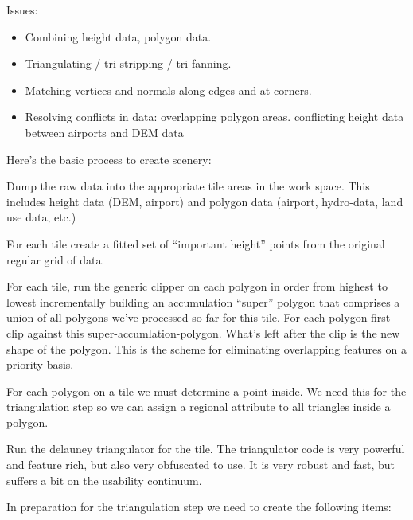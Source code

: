 \documentclass[12pt]{article}
\begin{document}
Issues:

\begin{itemize}
\item Combining height data, polygon data.

\item Triangulating / tri-stripping / tri-fanning.

\item Matching vertices and normals along edges and at corners.

\item Resolving conflicts in data:
  overlapping polygon areas.
  conflicting height data between airports and DEM data
\end{itemize}

Here's the basic process to create scenery:

Dump the raw data into the appropriate tile areas in the work space.
This includes height data (DEM, airport) and polygon data (airport,
hydro-data, land use data, etc.)

For each tile create a fitted set of ``important height'' points from
the original regular grid of data.

For each tile, run the generic clipper on each polygon in order from
highest to lowest incrementally building an accumulation ``super''
polygon that comprises a union of all polygons we've processed so far
for this tile.  For each polygon first clip against this
super-accumlation-polygon.  What's left after the clip is the new
shape of the polygon.  This is the scheme for eliminating overlapping
features on a priority basis.

For each polygon on a tile we must determine a point inside.  We need
this for the triangulation step so we can assign a regional attribute
to all triangles inside a polygon.

Run the delauney triangulator for the tile.  The triangulator code is
very powerful and feature rich, but also very obfuscated to use.  It
is very robust and fast, but suffers a bit on the usability continuum.

In preparation for the triangulation step we need to create the
following items:
\end{document}
